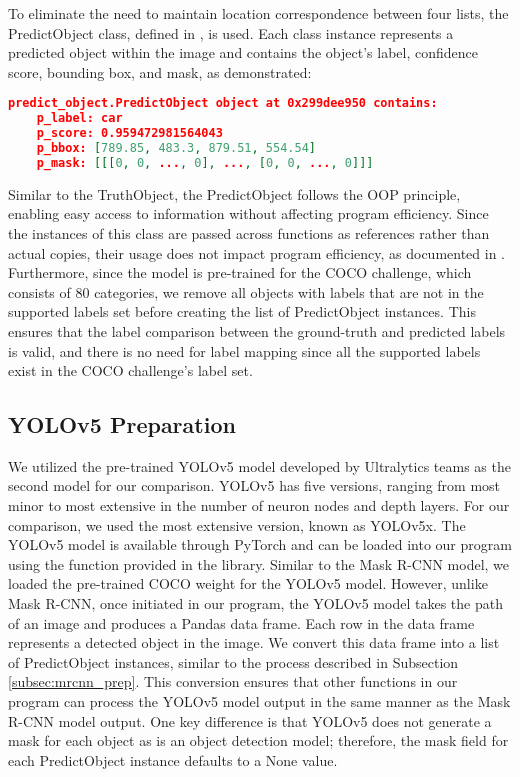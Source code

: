 To eliminate the need to maintain location correspondence between four lists, the PredictObject class, defined in , is used. Each class instance represents a predicted object within the image and contains the object's label, confidence score, bounding box, and mask, as demonstrated:
\begin{lstlisting}[language=json,firstnumber=1]
predict_object.PredictObject object at 0x299dee950 contains:
    p_label: car
    p_score: 0.959472981564043
    p_bbox: [789.85, 483.3, 879.51, 554.54]
    p_mask: [[[0, 0, ..., 0], ..., [0, 0, ..., 0]]]
\end{lstlisting}
Similar to the TruthObject, the PredictObject follows the OOP principle, enabling easy access to information without affecting program efficiency. Since the instances of this class are passed across functions as references rather than actual copies, their usage does not impact program efficiency, as documented in \cite{python3_docs}. Furthermore, since the model is pre-trained for the COCO challenge, which consists of 80 categories, we remove all objects with labels that are not in the supported labels set before creating the list of PredictObject instances. This ensures that the label comparison between the ground-truth and predicted labels is valid, and there is no need for label mapping since all the supported labels exist in the COCO challenge's label set.

\subsection{YOLOv5 Preparation}

We utilized the pre-trained YOLOv5 model developed by Ultralytics teams as the second model for our comparison. YOLOv5 has five versions, ranging from most minor to most extensive in the number of neuron nodes and depth layers. For our comparison, we used the most extensive version, known as YOLOv5x. The YOLOv5 model is available through PyTorch and can be loaded into our program using the  function provided in the  library. Similar to the Mask R-CNN model, we loaded the pre-trained COCO weight for the YOLOv5 model. However, unlike Mask R-CNN, once initiated in our program, the YOLOv5 model takes the path of an image and produces a Pandas data frame. Each row in the data frame represents a detected object in the image. We convert this data frame into a list of PredictObject instances, similar to the process described in Subsection \ref{subsec:mrcnn_prep}. This conversion ensures that other functions in our program can process the YOLOv5 model output in the same manner as the Mask R-CNN model output. One key difference is that YOLOv5 does not generate a mask for each object as is an object detection model; therefore, the mask field for each PredictObject instance defaults to a None value.